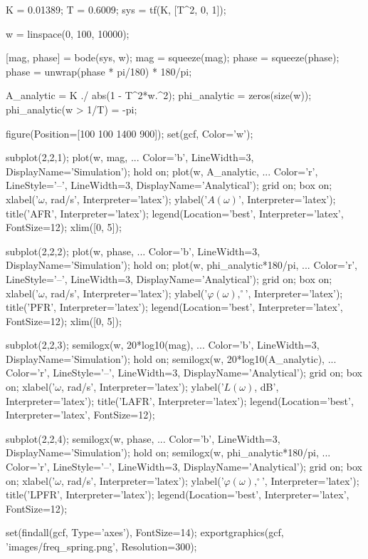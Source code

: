 \begin{matlabcode}
K = 0.01389;
T = 0.6009;
sys = tf(K, [T^2, 0, 1]);

w = linspace(0, 100, 10000);

[mag, phase] = bode(sys, w);
mag = squeeze(mag); phase = squeeze(phase);
phase = unwrap(phase * pi/180) * 180/pi;

A_analytic = K ./ abs(1 - T^2*w.^2);
phi_analytic = zeros(size(w));
phi_analytic(w > 1/T) = -pi;

figure(Position=[100 100 1400 900]);
set(gcf, Color='w');

subplot(2,2,1);
plot(w, mag, ...
    Color='b', LineWidth=3, DisplayName='Simulation');
hold on;
plot(w, A_analytic, ...
    Color='r', LineStyle='--', LineWidth=3, DisplayName='Analytical');
grid on; box on;
xlabel('$\omega$, rad/s', Interpreter='latex');
ylabel('$A(\omega)$', Interpreter='latex');
title('AFR', Interpreter='latex');
legend(Location='best', Interpreter='latex', FontSize=12);
xlim([0, 5]);

subplot(2,2,2);
plot(w, phase, ...
    Color='b', LineWidth=3, DisplayName='Simulation');
hold on;
plot(w, phi_analytic*180/pi, ...
    Color='r', LineStyle='--', LineWidth=3, DisplayName='Analytical');
grid on; box on;
xlabel('$\omega$, rad/s', Interpreter='latex');
ylabel('$\varphi(\omega), ^\circ$', Interpreter='latex');
title('PFR', Interpreter='latex');
legend(Location='best', Interpreter='latex', FontSize=12);
xlim([0, 5]);

subplot(2,2,3);
semilogx(w, 20*log10(mag), ...
    Color='b', LineWidth=3, DisplayName='Simulation');
hold on;
semilogx(w, 20*log10(A_analytic), ...
    Color='r', LineStyle='--', LineWidth=3, DisplayName='Analytical');
grid on; box on;
xlabel('$\omega$, rad/s', Interpreter='latex');
ylabel('$L(\omega)$, dB', Interpreter='latex');
title('LAFR', Interpreter='latex');
legend(Location='best', Interpreter='latex', FontSize=12);

subplot(2,2,4);
semilogx(w, phase, ...
    Color='b', LineWidth=3, DisplayName='Simulation');
hold on;
semilogx(w, phi_analytic*180/pi, ...
    Color='r', LineStyle='--', LineWidth=3, DisplayName='Analytical');
grid on; box on;
xlabel('$\omega$, rad/s', Interpreter='latex');
ylabel('$\varphi(\omega), ^\circ$', Interpreter='latex');
title('LPFR', Interpreter='latex');
legend(Location='best', Interpreter='latex', FontSize=12);

set(findall(gcf, Type='axes'), FontSize=14);
exportgraphics(gcf, 'images/freq_spring.png', Resolution=300);
\end{matlabcode}



